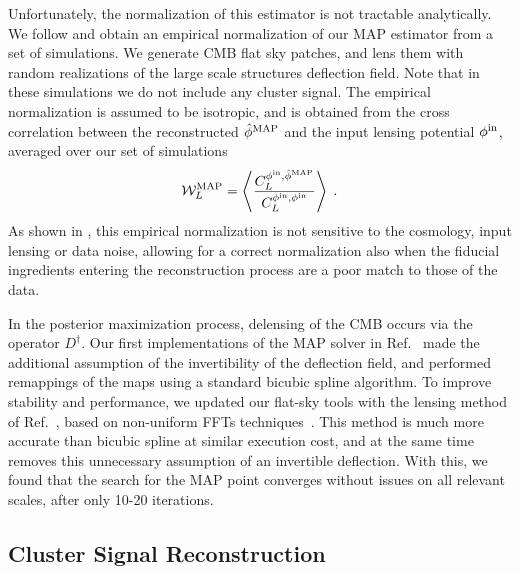 \documentclass[prd, superscriptaddress, tightenlines, longbibliography, nofootinbib, eqsecnum, amsfonts, amsmath, floatfix, twocolumn, notitlepage]{revtex4-2}
\newcommand{\JC}[1]{\color{purple}{{JC:#1}}\color{black}\xspace}
\newcommand{\LL}[1]{{\color{orange}{LL: #1}}}
\begin{document}
Unfortunately, the normalization of this estimator is not tractable analytically. We follow \cite{Legrand:2021qdu,Legrand:2023jne} and obtain an empirical normalization of our MAP estimator from a set of simulations.
We generate \LL{1000?} CMB flat sky patches, and lens them with random realizations of the large scale structures deflection field. Note that in these simulations we do not include any cluster signal. The empirical normalization is assumed to be isotropic, and is obtained from the cross correlation between the reconstructed $\hat \phi^{\rm MAP}$ and the input lensing potential $\phi^{\rm in}$, averaged over our set of simulations
\begin{equation}
    \mathcal{W}^{\rm MAP}_L = \left< \frac{C_L^{\phi^{\rm in}, \hat \phi^{\rm MAP}}}{C_L^{\phi^{\rm in}, \phi^{\rm in}}} \right> \; .
\end{equation}
As shown in \cite{Legrand:2021qdu,Legrand:2023jne}, this empirical normalization is not sensitive to the cosmology, input lensing or data noise, allowing for a correct normalization also when the fiducial ingredients entering the reconstruction process are a poor match to those of the data.


In the posterior maximization process, delensing of the CMB occurs via the operator $D^\dagger$. Our first implementations of the MAP solver in Ref.~\cite{Carron:2017mqf} made the additional assumption of the invertibility of the deflection field, and performed remappings of the maps using a standard bicubic spline algorithm. To improve stability and performance, we updated our flat-sky tools with the lensing method of Ref.~\cite{Reinecke:2023gtp}, based on non-uniform FFTs techniques~\cite{Barnett2019, Barnett2020}. This method is much more accurate than bicubic spline at similar execution cost, and at the same time removes this unnecessary assumption of an invertible deflection. With this, we found that the search for the MAP point converges without issues on all relevant scales, after only 10-20 iterations\JC{is that right ?}.


\subsection{Cluster Signal Reconstruction}
\label{sec:cluster_mass}
\LL{Should add a comment that to have the template kt we first need an estimate of the angular size of the cluster $\theta_s$ (which can be obtained from SZ effect like in Zubeldia paper, or else)}
\end{document}
